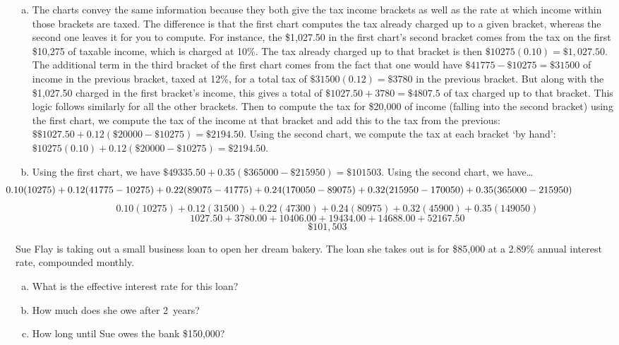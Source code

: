 \documentclass[11pt,letterpaper]{article}
\begin{document}
\sol
\begin{enumerate}[(a)]
\item The charts convey the same information because they both give the tax income brackets as well as the rate at which income within those brackets are taxed. The difference is that the first chart computes the tax already charged up to a given bracket, whereas the second one leaves it for you to compute. For instance, the \$1,027.50 in the first chart's second bracket comes from the tax on the first \$10,275 of taxable income, which is charged at 10\%. The tax already charged up to that bracket is then $\$10275(0.10)= \$1,027.50$. The additional term in the third bracket of the first chart comes from the fact that one would have $\$41775 - \$10275= \$31500$ of income in the previous bracket, taxed at 12\%, for a total tax of $\$31500(0.12)= \$3780$ in the previous bracket. But along with the \$1,027.50 charged in the first bracket's income, this gives a total of $\$1027.50 + 3780= \$4807.5$ of tax charged up to that bracket. This logic follows similarly for all the other brackets. Then to compute the tax for \$20,000 of income (falling into the second bracket) using the first chart, we compute the tax of the income at that bracket and add this to the tax from the previous: $\$\$1027.50 + 0.12(\$20000 - \$10275)= \$2194.50$. Using the second chart, we compute the tax at each bracket `by hand': $\$10275(0.10) + 0.12(\$20000 - \$10275)= \$2194.50$. 

\item Using the first chart, we have $\$49335.50 + 0.35(\$365000 - \$215950)= \$101503$. Using the second chart, we have\dots
	\[
	\hspace{-2.75cm}0.10(10275) + 0.12(41775 - 10275) + 0.22(89075 - 41775) + 0.24(170050 - 89075) + 0.32(215950 - 170050) + 0.35(365000 - 215950)
	\]
	\[
	0.10(10275) + 0.12(31500) + 0.22(47300) + 0.24(80975) + 0.32(45900) + 0.35(149050)
	\]
	\[
	1027.50 + 3780.00 + 10406.00 + 19434.00 + 14688.00 + 52167.50
	\]
	\[
	\$101,503
	\]
\end{enumerate}
	


\newpage



 Sue Flay is taking out a small business loan to open her dream bakery. The loan she takes out is for \$85,000 at a 2.89\% annual interest rate, compounded monthly.
	\begin{enumerate}[(a)]
	\item What is the effective interest rate for this loan?
	\item How much does she owe after 2~years?
	\item How long until Sue owes the bank \$150,000?
	\end{enumerate} \pspace
\end{document}
